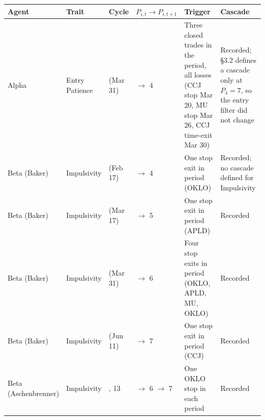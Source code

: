 \documentclass[11pt]{article}
\begin{document}
{\def\LTcaptype{none} %
{\small
\begin{longtable}{@{}
  >{\raggedright\arraybackslash}p{}
  >{\raggedright\arraybackslash}p{}
  >{\raggedright\arraybackslash}p{}
  >{\raggedright\arraybackslash}p{}
  >{\raggedright\arraybackslash}p{}
  >{\raggedright\arraybackslash}p{}@{}}
\toprule\noalign{}
\begin{minipage}[b]{\linewidth}\raggedright
Agent
\end{minipage} & \begin{minipage}[b]{\linewidth}\raggedright
Trait
\end{minipage} & \begin{minipage}[b]{\linewidth}\raggedright
Cycle
\end{minipage} & \begin{minipage}[b]{\linewidth}\raggedright
\(P_{i,t} \to P_{i,t+1}\)
\end{minipage} & \begin{minipage}[b]{\linewidth}\raggedright
Trigger
\end{minipage} & \begin{minipage}[b]{\linewidth}\raggedright
Cascade
\end{minipage} \\
\midrule\noalign{}
\endhead
\bottomrule\noalign{}
\endlastfoot
\renewcommand{\arraystretch}{1.15}
Alpha & Entry Patience & 6 (Mar 31) & 3 $\rightarrow$ 4 & Three closed trades in the period, all losses (CCJ stop Mar 20, MU stop Mar 26, CCJ time-exit Mar 30) & Recorded; §3.2 defines a cascade only at \(P_4 = 7\), so the entry filter did not change \\
Beta (Baker) & Impulsivity & 3 (Feb 17) & 3 $\rightarrow$ 4 & One stop exit in period (OKLO) & Recorded; no cascade defined for Impulsivity \\
Beta (Baker) & Impulsivity & 5 (Mar 17) & 4 $\rightarrow$ 5 & One stop exit in period (APLD) & Recorded \\
Beta (Baker) & Impulsivity & 6 (Mar 31) & 5 $\rightarrow$ 6 & Four stop exits in period (OKLO, APLD, MU, OKLO) & Recorded \\
Beta (Baker) & Impulsivity & 11 (Jun 11) & 6 $\rightarrow$ 7 & One stop exit in period (CCJ) & Recorded \\
Beta (Aschenbrenner) & Impulsivity & 12, 13 & 5 $\rightarrow$ 6 $\rightarrow$ 7 & One OKLO stop in each period & Recorded \\
\end{longtable}}
}
\end{document}
